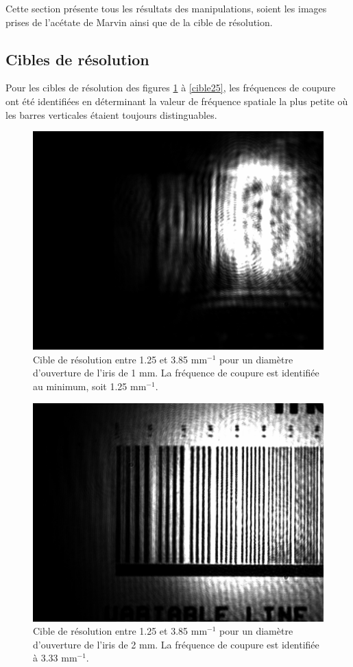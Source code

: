 \documentclass[11pt,letterpaper]{article}
\begin{document}
Cette section présente tous les résultats des manipulations, soient les images prises de l'acétate de Marvin
ainsi que de la cible de résolution.

\subsection{Cibles de résolution}

Pour les cibles de résolution des figures \ref{cible1.2} à \ref{cible25}, les fréquences de coupure ont été identifiées en déterminant la
valeur de fréquence spatiale la plus petite où les barres verticales étaient toujours distinguables.

\begin{figure}[H]
  \centering
  \includegraphics[scale=0.26]{cible_d1.2_1-7.png}
  \caption{Cible de résolution entre 1.25 et 3.85 mm$^{-1}$ pour un diamètre d'ouverture de l'iris de 1 mm. La fréquence de coupure est identifiée au minimum, soit 1.25 mm$^{-1}$.}
  \label{cible1.2}
\end{figure}

\begin{figure}[H]
  \centering
  \includegraphics[scale=0.26]{cible_d2_1-7.png}
  \caption{Cible de résolution entre 1.25 et 3.85 mm$^{-1}$ pour un diamètre d'ouverture de l'iris de 2 mm. La fréquence de coupure est identifiée à 3.33 mm$^{-1}$.}
  \label{cible2}
\end{figure}
\end{document}
